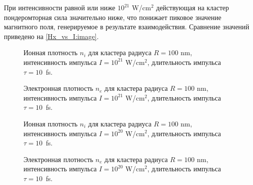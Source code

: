 При интенсивности равной или ниже $10^{21}$ W/cm$^2$ действующая на кластер пондеромторная сила значительно ниже, что понижает пиковое значение магнитного поля, генерируемое в результате взаимодействия. Сравнение значений приведено на \autoref{Hx_vs_I:image}.

\begin{figure}[H]
    \hfil
    \caption{Ионная плотность $n_i$ для кластера радиуса $R = 100$ nm, интенсивность импульса $I = 10^{21}$ W/cm$^{2}$, длительность импульса $\tau = 10$~fs.}\label{ni_100nm_1e21:image}
\end{figure}

\begin{figure}[H]
    \hfil
    \caption{Электронная плотность $n_e$ для кластера радиуса $R = 100$ nm, интенсивность импульса $I = 10^{21}$ W/cm$^{2}$, длительность импульса $\tau = 10$~fs.}\label{ne_100nm_1e21:image}
\end{figure}

\begin{figure}[H]
    \hfil
    \caption{Ионная плотность $n_i$ для кластера радиуса $R = 100$ nm, интенсивность импульса $I = 10^{20}$ W/cm$^{2}$, длительность импульса $\tau = 10$~fs.}\label{ni_100nm_1e20:image}
\end{figure}

\begin{figure}[H]
    \hfil
    \caption{Электронная плотность $n_e$ для кластера радиуса $R = 100$ nm, интенсивность импульса $I = 10^{20}$ W/cm$^{2}$, длительность импульса $\tau = 10$~fs.}\label{ne_100nm_1e20:image}
\end{figure}

